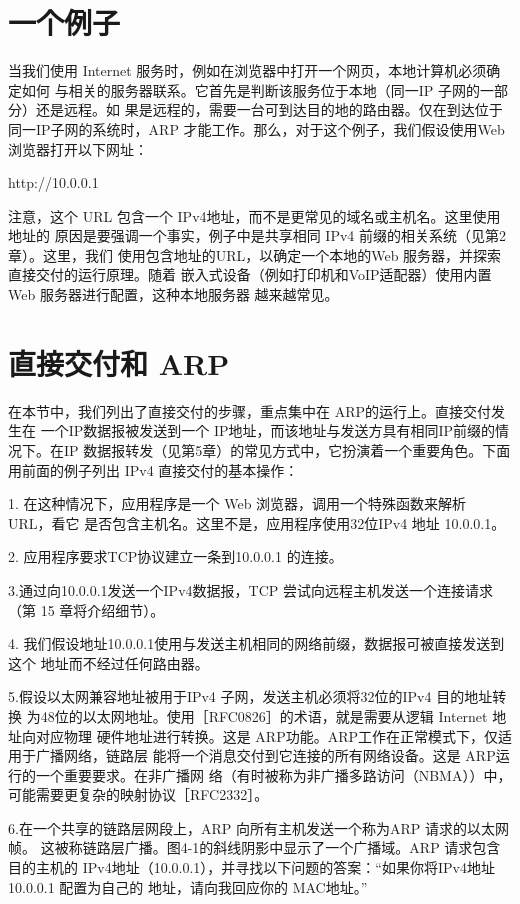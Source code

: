 \section{一个例子}

当我们使用 Internet 服务时，例如在浏览器中打开一个网页，本地计算机必须确定如何
与相关的服务器联系。它首先是判断该服务位于本地（同一IP 子网的一部分）还是远程。如
果是远程的，需要一台可到达目的地的路由器。仅在到达位于同一IP子网的系统时，ARP
才能工作。那么，对于这个例子，我们假设使用Web 浏览器打开以下网址：

http://10.0.0.1

注意，这个 URL 包含一个 IPv4地址，而不是更常见的域名或主机名。这里使用地址的
原因是要强调一个事实，例子中是共享相同 IPv4 前缀的相关系统（见第2章）。这里，我们
使用包含地址的URL，以确定一个本地的Web 服务器，并探索直接交付的运行原理。随着
嵌入式设备（例如打印机和VoIP适配器）使用内置Web 服务器进行配置，这种本地服务器
越来越常见。

\section{直接交付和 ARP}

在本节中，我们列出了直接交付的步骤，重点集中在 ARP的运行上。直接交付发生在
一个IP数据报被发送到一个 IP地址，而该地址与发送方具有相同IP前缀的情况下。在IP
数据报转发（见第5章）的常见方式中，它扮演着一个重要角色。下面用前面的例子列出
IPv4 直接交付的基本操作：

1. 在这种情况下，应用程序是一个 Web 浏览器，调用一个特殊函数来解析 URL，看它
是否包含主机名。这里不是，应用程序使用32位IPv4 地址 10.0.0.1。

2. 应用程序要求TCP协议建立一条到10.0.0.1 的连接。

3.通过向10.0.0.1发送一个IPv4数据报，TCP 尝试向远程主机发送一个连接请求（第
15 章将介绍细节）。

4. 我们假设地址10.0.0.1使用与发送主机相同的网络前缀，数据报可被直接发送到这个
地址而不经过任何路由器。

5.假设以太网兼容地址被用于IPv4 子网，发送主机必须将32位的IPv4 目的地址转换
为48位的以太网地址。使用［RFC0826］的术语，就是需要从逻辑 Internet 地址向对应物理
硬件地址进行转换。这是 ARP功能。ARP工作在正常模式下，仅适用于广播网络，链路层
能将一个消息交付到它连接的所有网络设备。这是 ARP运行的一个重要要求。在非广播网
络（有时被称为非广播多路访问（NBMA））中，可能需要更复杂的映射协议［RFC2332］。

6.在一个共享的链路层网段上，ARP 向所有主机发送一个称为ARP 请求的以太网帧。
这被称链路层广播。图4-1的斜线阴影中显示了一个广播域。ARP 请求包含目的主机的
IPv4地址（10.0.0.1），并寻找以下问题的答案：“如果你将IPv4地址10.0.0.1 配置为自己的
地址，请向我回应你的 MAC地址。”


